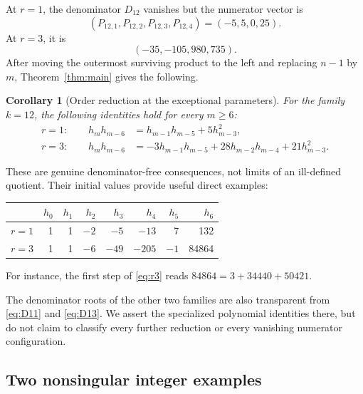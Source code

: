 \documentclass[11pt,letterpaper]{article}
\numberwithin{equation}{section}
\newtheorem{corollary}[theorem]{Corollary}
\theoremstyle{definition}
\begin{document}
At \(r=1\), the denominator \(D_{12}\) vanishes but the numerator vector is
\begin{equation}
 (P_{12,1},P_{12,2},P_{12,3},P_{12,4})=(-5,5,0,25).
\end{equation}
At \(r=3\), it is
\begin{equation}
 (-35,-105,980,735).
\end{equation}
After moving the outermost surviving product to the left and replacing
\(n-1\) by \(m\), Theorem~\ref{thm:main} gives the following.

\begin{corollary}[Order reduction at the exceptional parameters]
For the family \(k=12\), the following identities hold for every \(m\geq6\):
\begin{align}
 r=1:\qquad
 h_mh_{m-6}&=h_{m-1}h_{m-5}+5h_{m-3}^2,\label{eq:r1}\\
 r=3:\qquad
 h_mh_{m-6}&=-3h_{m-1}h_{m-5}
              +28h_{m-2}h_{m-4}+21h_{m-3}^2.
 \label{eq:r3}
\end{align}
\end{corollary}

These are genuine denominator-free consequences, not limits of an
ill-defined quotient. Their initial values provide useful direct examples:
\begin{center}
\begin{tabular}{c rrrrrrr}
\toprule
 &\(h_0\)&\(h_1\)&\(h_2\)&\(h_3\)&\(h_4\)&\(h_5\)&\(h_6\)\\
\midrule
\(r=1\)&1&1&$-2$&$-5$&$-13$&7&132\\
\(r=3\)&1&1&$-6$&$-49$&$-205$&$-1$&84864\\
\bottomrule
\end{tabular}
\end{center}
For instance, the first step of \eqref{eq:r3} reads
\(84864=3+34440+50421\).

The denominator roots of the other two families are also transparent from
\eqref{eq:D11} and \eqref{eq:D13}. We assert the specialized polynomial
identities there, but do not claim to classify every further reduction or
every vanishing numerator configuration.

\subsection{Two nonsingular integer examples}
\end{document}
